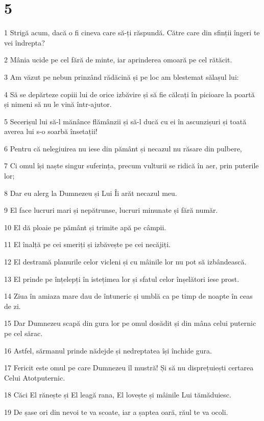 \chapter{5}

\par 1 Strigă acum, dacă o fi cineva care să-ți răspundă. Către care din sfinții îngeri te vei îndrepta?
\par 2 Mânia ucide pe cel fără de minte, iar aprinderea omoară pe cel rătăcit.
\par 3 Am văzut pe nebun prinzând rădăcină și pe loc am blestemat sălașul lui:
\par 4 Să se depărteze copiii lui de orice izbăvire și să fie călcați în picioare la poartă și nimeni să nu le vină într-ajutor.
\par 5 Secerișul lui să-l mănânce flămânzii și să-l ducă cu ei în ascunzișuri și toată averea lui s-o soarbă însetații!
\par 6 Pentru că nelegiuirea nu iese din pământ și necazul nu răsare din pulbere,
\par 7 Ci omul își naște singur suferința, precum vulturii se ridică în aer, prin puterile lor;
\par 8 Dar eu alerg la Dumnezeu și Lui Îi arăt necazul meu.
\par 9 El face lucruri mari și nepătrunse, lucruri minunate și fără număr.
\par 10 El dă ploaie pe pământ și trimite apă pe câmpii.
\par 11 El înalță pe cei smeriți și izbăvește pe cei necăjiți.
\par 12 El destramă planurile celor vicleni și cu mâinile lor nu pot să izbândească.
\par 13 El prinde pe înțelepți în istețimea lor și sfatul celor înșelători iese prost.
\par 14 Ziua în amiaza mare dau de întuneric și umblă ca pe timp de noapte în ceas de zi.
\par 15 Dar Dumnezeu scapă din gura lor pe omul dosădit și din mâna celui puternic pe cel sărac.
\par 16 Astfel, sărmanul prinde nădejde și nedreptatea își închide gura.
\par 17 Fericit este omul pe care Dumnezeu îl mustră! Și să nu disprețuiești certarea Celui Atotputernic.
\par 18 Căci El rănește și El leagă rana, El lovește și mâinile Lui tămăduiesc.
\par 19 De șase ori din nevoi te va scoate, iar a șaptea oară, răul te va ocoli.
